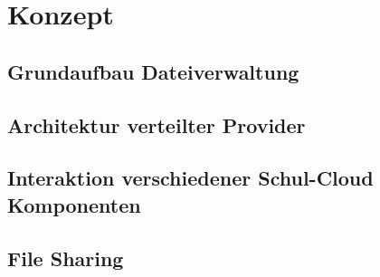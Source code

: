 \section{Konzept}
\label{sec:concept}

\subsection{Grundaufbau Dateiverwaltung}

\subsection{Architektur verteilter Provider}

\subsection{Interaktion verschiedener Schul-Cloud Komponenten}

\subsection{File Sharing}

\clearpage
